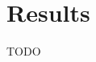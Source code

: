 \documentclass[final]{ieee}
\begin{document}













\section{Results}
TODO
            
\end{document}
